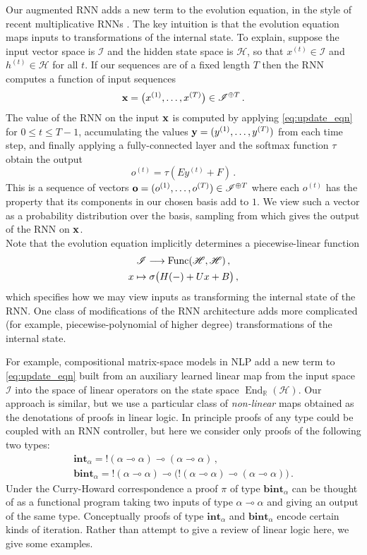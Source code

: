 \documentclass[english,letter paper,12pt,leqno]{article}
\theoremstyle{example}
\numberwithin{equation}{section}
\DeclareMathOperator{\End}{End}
\begin{document}
Our augmented RNN adds a new term to the evolution equation, in the style of recent multiplicative RNNs \cite{yuhai,sutskever,irsoy}. The key intuition is that the evolution equation maps inputs to transformations of the internal state. To explain, suppose the input vector space is $\mathscr{I}$ and the hidden state space is $\mathscr{H}$, so that $x^{(t)} \in \mathscr{I}$ and $h^{(t)} \in \mathscr{H}$ for all $t$. If our sequences are of a fixed length $T$ then the RNN computes a function of input sequences
\[
\bold{x} = \big( x^{(1)}, \ldots, x^{(T)} \big) \in \mathscr{I}^{\oplus T}\,.
\]
The value of the RNN on the input $\bold{x}$ is computed by applying \eqref{eq:update_eqn} for $0 \le t \le T - 1$, accumulating the values $\bold{y} = (y^{(1)}, \ldots, y^{(T)})$ from each time step, and finally applying a fully-connected layer and the softmax function $\tau$ obtain the output
\[
o^{(t)} = \tau( E y^{(t)} + F )\,.
\]
This is a sequence of vectors $\bold{o} = (o^{(1)},\ldots,o^{(T)}) \in \mathscr{I}^{\oplus T}$ where each $o^{(t)}$ has the property that its components in our chosen basis add to $1$. We view such a vector as a probability distribution over the basis, sampling from which gives the output of the RNN on $\bold{x}$.
\\

Note that the evolution equation implicitly determines a piecewise-linear function
\begin{gather*}
\mathscr{I} \longrightarrow \operatorname{Func}(\mathscr{H}, \mathscr{H} )\,,\\
x \mapsto \sigma\big( H (-) + U x + B\big)\,,
\end{gather*}
which specifies how we may view inputs as transforming the internal state of the RNN. One class of modifications of the RNN architecture adds more complicated (for example, piecewise-polynomial of higher degree) transformations of the internal state.

For example, compositional matrix-space models in NLP \cite{irsoy} add a new term to \eqref{eq:update_eqn} built from an auxiliary learned linear map from the input space $\mathscr{I}$ into the space of linear operators on the state space $\End_{\mathbb{R}}(\mathscr{H})$. Our approach is similar, but we use a particular class of \emph{non-linear} maps obtained as the denotations of proofs in linear logic. In principle proofs of any type could be coupled with an RNN controller, but here we consider only proofs of the following two types:
\begin{gather*}
\textbf{int}_\alpha = {!}(\alpha \multimap \alpha) \multimap (\alpha \multimap \alpha)\,,\\
\textbf{bint}_\alpha = {!}(\alpha \multimap \alpha) \multimap \big({!}(\alpha \multimap \alpha) \multimap (\alpha \multimap \alpha)\big)\,.
\end{gather*}
Under the Curry-Howard correspondence a proof $\pi$ of type $\textbf{bint}_\alpha$ can be thought of as a functional program taking two inputs of type $\alpha \multimap \alpha$ and giving an output of the same type. Conceptually proofs of type $\textbf{int}_\alpha$ and $\textbf{bint}_\alpha$ encode certain kinds of iteration. Rather than attempt to give a review of linear logic here, we give some examples.
\end{document}
